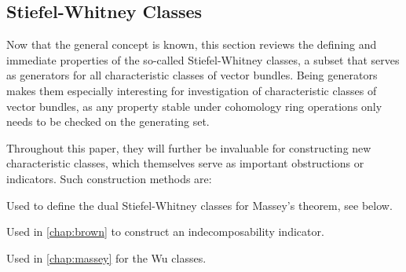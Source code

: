 \subsection{Stiefel-Whitney Classes}
\label{sec:swclasses}
Now that the general concept is known, this section reviews the
defining and immediate properties of the so-called Stiefel-Whitney
classes, a subset that serves as generators for all characteristic
classes of vector bundles.
Being generators makes them especially interesting for investigation
of characteristic classes of vector bundles,
as any property stable under cohomology ring operations only needs to
be checked on the generating set.

Throughout this paper, they will further be invaluable for
constructing new characteristic classes, which themselves serve
as important obstructions or indicators. Such construction methods
are:
\begin{description}[labelindent=1em]
\item[{Formally invert them.}]
  Used to define the dual Stiefel-Whitney classes for Massey's
  theorem, see below.
\item[{Algebraically combine Stiefel-Whitney classes.}]
  Used in \autoref{chap:brown} to construct an indecomposability
  indicator.
\item[{Apply Steenrod squares.}]
  Used in \autoref{chap:massey} for the Wu classes.
\end{description}

